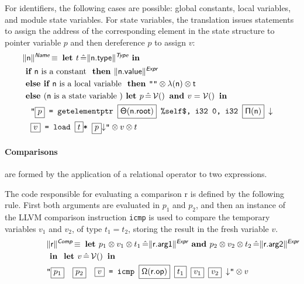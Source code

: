 \documentclass{llncs}
\newcommand{\trad}[2]{\ensuremath{\lVert \textsf{#1} \rVert^{\textit{#2}}}}
\newcommand{\nl}[0]{\ensuremath{\downarrow}}
\DeclareMathOperator{\isdef}{\equiv}
\DeclareMathOperator{\variable}{\mathcal{V}()}
\newcommand{\llvm}[1]{\texttt{#1}}
\newcommand{\B}[1]{\textsf{#1}}
\newcommand{\IF}[0]{\textbf{ if }}
\newcommand{\ELSIF}[0]{\textbf{ else if }}
\newcommand{\ELSE}[0]{\textbf{ else }}
\newcommand{\THEN}[0]{\textbf{ then }}
\newcommand{\LET}[0]{\textbf{ let }}
\DeclareMathOperator{\BE}{\hat{=}}
\newcommand{\IN}[0]{\textbf{ in }}
\newcommand{\AND}[0]{\textbf{ and }}
\newcommand{\PH}[1]{\framebox{$#1$}}
\newcommand{\sep}[0]{\otimes}
\newcommand{\local}[0]{\ensuremath{\sf\lambda}}
\newcommand{\opmap}[0]{\ensuremath{\sf\Omega}}
\newcommand{\idx}[0]{\ensuremath{\sf\Pi}}
\newcommand{\state}[0]{\ensuremath{\sf\Theta}}
\newcommand{\self}[0]{\llvm{\%self\$}}
\begin{document}
For identifiers, the following cases are possible: global constants, local
variables, and module state variables. For state variables, the translation
issues statements to assign the address of the corresponding element in the
state structure to pointer variable $p$ and then dereference $p$ to assign $v$:
\begin{align*}
\lefteqn{\trad{n}{\B{Name}} \isdef \LET t \BE \trad{n.type}{\B{Type}} \IN} \\
& \IF \B{n} \mbox{ is a constant } \THEN \trad{n.value}{\B{Expr}} \\
& \ELSIF \B{n} \mbox{ is a local variable } \THEN
\llvm{""} \sep \local(\B{n}) \sep t \\
& \ELSE (\B{n} \mbox{ is a state variable }) \LET p \BE \variable \AND v = \variable \IN \\
& \quad \llvm{"\PH{p} = getelementptr \PH{\state(\B{n.root})} \self, i32 0, i32 \PH{\idx(\B{n})} \nl} \\
& \quad \llvm{\PH{v} = load \PH{t}* \PH{p}\nl"} \sep v \sep t
\end{align*}

\paragraph{Comparisons} are formed by the application of a relational operator
to two expressions.

The code responsible for evaluating a comparison \B{r} is defined by the
following rule. First both arguments are evaluated in $p_1$ and $p_2$, and then
an instance of the LLVM comparison instruction \llvm{icmp} is used to compare
the temporary variables $v_1$ and $v_2$, of type $t_1 = t_2$, storing the result
in the fresh variable $v$.
\begin{align*}
\lefteqn{\trad{r}{\B{Comp}} \isdef
  \LET
  p_1 \sep v_1 \sep t_1 \BE \trad{r.arg1}{\B{Expr}} \AND
  p_2 \sep v_2 \sep t_2 \BE \trad{r.arg2}{\B{Expr}}} \\
& \IN \LET v \BE \variable \IN \\
& \llvm{"\PH{p_1}\quad\PH{p_2}\quad\PH{v} = icmp \PH{\opmap(\B{r.op})} \PH{t_1} \PH{v_1} \PH{v_2} \nl"} \sep v
\end{align*}
\end{document}
